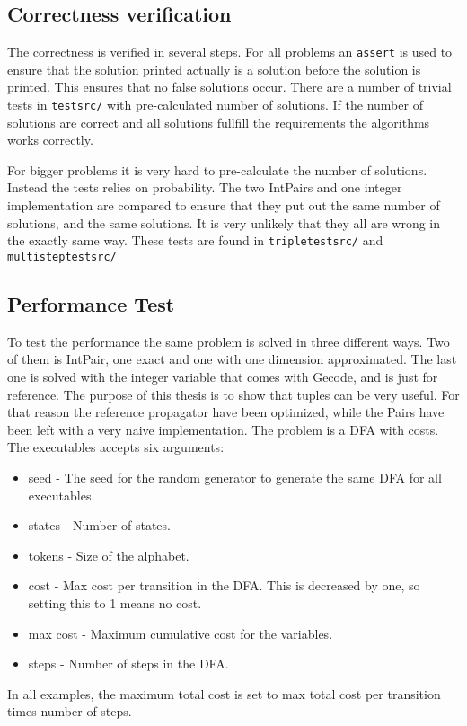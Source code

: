 \documentclass[a4paper,11pt]{article}
\begin{document}
\subsection{Correctness verification}
The correctness is verified in several steps. For all problems an \texttt{assert} is used to ensure that the solution printed actually is a solution before the solution is printed. This ensures that no false solutions occur. There are a number of trivial tests in \texttt{testsrc/} with pre-calculated number of solutions. If the number of solutions are correct and all solutions fullfill the requirements the algorithms works correctly.

For bigger problems it is very hard to pre-calculate the number of solutions. Instead the tests relies on probability. The two IntPairs and one integer implementation are compared to ensure that they put out the same number of solutions, and the same solutions. It is very unlikely that they all are wrong in the exactly same way. These tests are found in \texttt{tripletestsrc/} and \texttt{multisteptestsrc/}

\subsection{Performance Test}
To test the performance the same problem is solved in three different ways. Two of them is IntPair, one exact and one with one dimension approximated. The last one is solved with the integer variable that comes with Gecode, and is just for reference. The purpose of this thesis is to show that tuples can be very useful. For that reason the reference propagator have been optimized, while the Pairs have been left with a very naive implementation. The problem is a DFA with costs. The executables accepts six arguments: 
\begin{itemize}
\item{seed} - The seed for the random generator to generate the same DFA for all executables.
\item{states} - Number of states.
\item{tokens} - Size of the alphabet.
\item{cost} - Max cost per transition in the DFA. This is decreased by one, so setting this to 1 means no cost.
\item{max cost} - Maximum cumulative cost for the variables.
\item{steps} - Number of steps in the DFA.
\end{itemize}
In all examples, the maximum total cost is set to max total cost per transition times number of steps.
\end{document}
